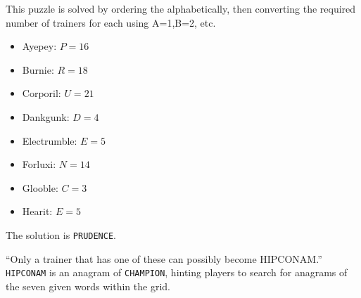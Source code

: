 
This puzzle is solved by ordering the \mappMobimon{} alphabetically,
then converting the required number of trainers for each
using A=1,B=2, etc.

\begin{multicols}{2}
\begin{itemize}
  \item {Ayepey}: \(P=16\)
  \item {Burnie}: \(R=18\)
  \item {Corporil}: \(U=21\)
  \item {Dankgunk}: \(D=4\)
  \item {Electrumble}: \(E=5\)
  \item {Forluxi}: \(N=14\)
  \item {Glooble}: \(C=3\)
  \item {Hearit}: \(E=5\)
\end{itemize}
\end{multicols}

The solution is \texttt{PRUDENCE}.


``Only a trainer that has one of these can possibly become HIPCONAM.''
\texttt{HIPCONAM} is an anagram of \texttt{CHAMPION}, hinting players to
search for anagrams of the seven given words within the grid.

